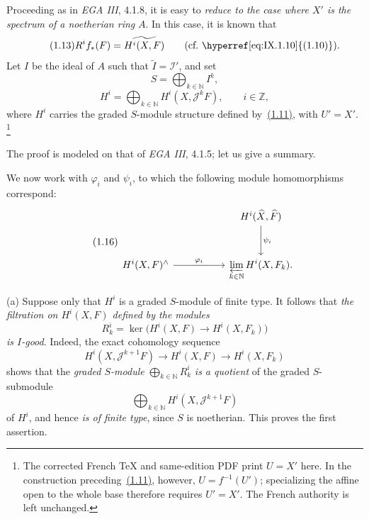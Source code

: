 Proceeding as in \emph{EGA III}, 4.1.8, it is easy to \emph{reduce to the case
where $X'$ is the spectrum of a noetherian ring} $A$. In this case, it is
known that
\begin{equation}
\tag{1.13}\label{eq:IX.1.13}
R^i f_*(F)=\widetilde{H^i(X,F)}
\qquad\text{(cf.~\hyperref[eq:IX.1.10]{(1.10)}).}
\end{equation}
Let $I$ be the ideal of $A$ such that $\widetilde I=\mathcal I'$, and set
\begin{equation}
\tag{1.14}\label{eq:IX.1.14}
S=\bigoplus_{k\in\mathbb N}I^k,
\end{equation}
\begin{equation}
\tag{1.15}\label{eq:IX.1.15}
H^i=\bigoplus_{k\in\mathbb N}H^i(X,\mathcal J^kF),
\qquad i\in\mathbb Z,
\end{equation}
where $H^i$ carries the graded $S$-module structure defined by~\hyperref[eq:IX.1.11]{(1.11)}, with
$U'=X'$.
\footnote{The corrected French TeX and same-edition PDF print $U=X'$ here.
In the construction preceding~\hyperref[eq:IX.1.11]{(1.11)}, however, $U=f^{-1}(U')$; specializing
the affine open to the whole base therefore requires $U'=X'$. The French
authority is left unchanged.}

The proof is modeled on that of \emph{EGA III}, 4.1.5; let us give a summary.

We now work with $\varphi_i$ and $\psi_i$, to which the following module
homomorphisms correspond:
\begin{equation}
\tag{1.16}\label{eq:IX.1.16}
\begin{tikzcd}[column sep=5.2em,row sep=3.0em]
& H^i(\widehat X,\widehat F)
    \arrow[d,"\psi_i"] \\
H^i(X,F)^{\wedge}
    \arrow[r,"\varphi_i"]
& \displaystyle\varprojlim_{k\in\mathbb N}H^i(X,F_k).
\end{tikzcd}
\end{equation}

\noindent\textup{(a)} Suppose only that $H^i$ is a graded $S$-module of finite
type. It follows that \emph{the filtration on $H^i(X,F)$ defined by the
modules}
\begin{equation}
\tag{1.17}\label{eq:IX.1.17}
R_k^i=\ker\bigl(H^i(X,F)\longrightarrow H^i(X,F_k)\bigr)
\end{equation}
\emph{is $I$-good}. Indeed, the exact cohomology sequence
\begin{equation}
\tag{1.18}\label{eq:IX.1.18}
H^i(X,\mathcal J^{k+1}F)\longrightarrow H^i(X,F)
  \longrightarrow H^i(X,F_k)
\end{equation}
shows that the \emph{graded $S$-module}
$\bigoplus_{k\in\mathbb N}R_k^i$ \emph{is a quotient} of the graded
$S$-submodule
\[
\bigoplus_{k\in\mathbb N}H^i(X,\mathcal J^{k+1}F)
\]
of $H^i$, and hence \emph{is of finite type}, since $S$ is noetherian. This
proves the first assertion.

